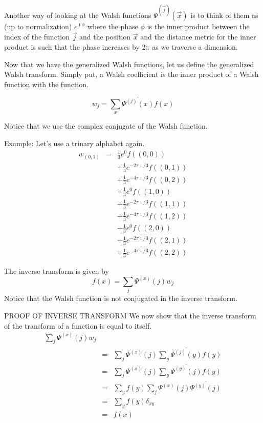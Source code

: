 Another way of looking at the Walsh functions $\Psi^{(\vec{j})}(\vec{x})$ 
is to think of 
them as (up to normalization) $e^{\imath \phi}$ where the phase $\phi$ 
is the inner product between the index of the function $\vec{j}$ and the
position $\vec{x}$ and the distance metric for the inner product is such
that the phase increases by $2 \pi$ as we traverse a dimension.

Now that we have the generalized Walsh functions, let us define the
generalized Walsh transform.  Simply put, a Walsh coefficient is the inner 
product of a Walsh function with the function.

\begin{equation}
w_j=\sum_x{\overline{\Psi^{(j)}(x)} f(x)}	\label{transform}
\end{equation}

Notice that we use the complex conjugate of the Walsh function.

Example:
Let's use a trinary alphabet again.
\begin{eqnarray}
w_{(0,1)} &=& \frac{1}{3} e^0 f((0,0)) \nonumber \\
	& &+ \frac{1}{3} e^{-2 \pi \imath /3} f((0,1)) \nonumber \\
	& &+ \frac{1}{3} e^{-4 \pi \imath /3} f((0,2)) \nonumber \\
	& &+ \frac{1}{3} e^0 f((1,0)) \nonumber \\
	& &+ \frac{1}{3} e^{-2 \pi \imath /3} f((1,1)) \nonumber \\
	& &+ \frac{1}{3} e^{-4 \pi \imath/3} f((1,2)) \nonumber\\
	& &+ \frac{1}{3} e^0 f((2,0)) \nonumber \\
	& &+ \frac{1}{3} e^{-2 \pi \imath /3} f((2,1)) \nonumber \\
	& &+ \frac{1}{3} e^{-4 \pi \imath /3} f((2,2))
\end{eqnarray}

The inverse transform is given by
\begin{equation}
f(x)=\sum_j{\Psi^{(x)}(j) w_j}	\label{inverse}
\end{equation}
Notice that the Walsh function is not conjugated in the inverse transform.

PROOF OF INVERSE TRANSFORM
We now show that the inverse transform of the transform of a function is
equal to itself.
\begin{eqnarray}
\sum_j{\Psi^{(x)}(j) w_j} &&\nonumber \\
&=& \sum_j{\Psi^{(x)}(j) \sum_y{\overline{\Psi^{(j)}(y)} f(y)}} \nonumber \\
&=& \sum_j{\Psi^{(x)}(j) \sum_y{\overline{\Psi^{(y)}(j)} f(y)}} \nonumber \\
&=& \sum_y{f(y) \sum_j {\Psi^{(x)}(j) \overline{\Psi^{(y)}(j)}}} \nonumber \\
&=& \sum_y{f(y) \delta_{xy}}\nonumber \\
&=& f(x)
\end{eqnarray}

